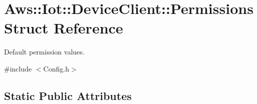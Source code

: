 \hypertarget{struct_aws_1_1_iot_1_1_device_client_1_1_permissions}{}\section{Aws\+:\+:Iot\+:\+:Device\+Client\+:\+:Permissions Struct Reference}
\label{struct_aws_1_1_iot_1_1_device_client_1_1_permissions}


Default permission values.  




{\ttfamily \#include $<$Config.\+h$>$}

\subsection*{Static Public Attributes}
